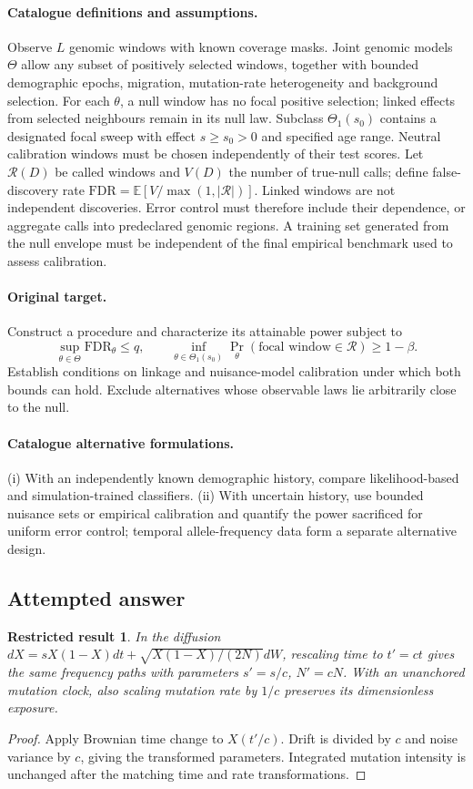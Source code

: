 \documentclass[11pt]{article}
\newcommand{\E}{\mathbb E}
\providecommand{\E}{\mathbb E}
\newtheorem{attemptresult}{Restricted result}[section]
\begin{document}
\paragraph{Catalogue definitions and assumptions.}
Observe $L$ genomic windows with known coverage masks. Joint genomic models $\Theta$ allow any subset of positively selected windows, together with bounded demographic epochs, migration, mutation-rate heterogeneity and background selection. For each $\theta$, a null window has no focal positive selection; linked effects from selected neighbours remain in its null law. Subclass $\Theta_1(s_0)$ contains a designated focal sweep with effect $s\ge s_0>0$ and specified age range. Neutral calibration windows must be chosen independently of their test scores. Let $\mathcal R(D)$ be called windows and $V(D)$ the number of true-null calls; define false-discovery rate $\mathrm{FDR}=\E[V/\max(1,|\mathcal R|)]$. Linked windows are not independent discoveries. Error control must therefore include their dependence, or aggregate calls into predeclared genomic regions. A training set generated from the null envelope must be independent of the final empirical benchmark used to assess calibration.
\paragraph{Original target.}
Construct a procedure and characterize its attainable power subject to
\[
 \sup_{\theta\in\Theta}\mathrm{FDR}_\theta\le q,
 \qquad
 \inf_{\theta\in\Theta_1(s_0)}
 \Pr_\theta(\text{focal window}\in\mathcal R)\ge1-\beta.
\]
Establish conditions on linkage and nuisance-model calibration under which both bounds can hold. Exclude alternatives whose observable laws lie arbitrarily close to the null.
\paragraph{Catalogue alternative formulations.}
(i) With an independently known demographic history, compare likelihood-based and simulation-trained classifiers. (ii) With uncertain history, use bounded nuisance sets or empirical calibration and quantify the power sacrificed for uniform error control; temporal allele-frequency data form a separate alternative design.
\subsection{Attempted answer}
\begin{attemptresult}
In the diffusion $dX=sX(1-X)dt+\sqrt{X(1-X)/(2N)}dW$, rescaling time to $t\prime=ct$ gives the same frequency paths with parameters $s\prime=s/c$, $N\prime=cN$. With an unanchored mutation clock, also scaling mutation rate by $1/c$ preserves its dimensionless exposure.
\end{attemptresult}
\begin{proof}
Apply Brownian time change to $X(t\prime/c)$. Drift is divided by $c$ and noise variance by $c$, giving the transformed parameters. Integrated mutation intensity is unchanged after the matching time and rate transformations.
\end{proof}
\end{document}
